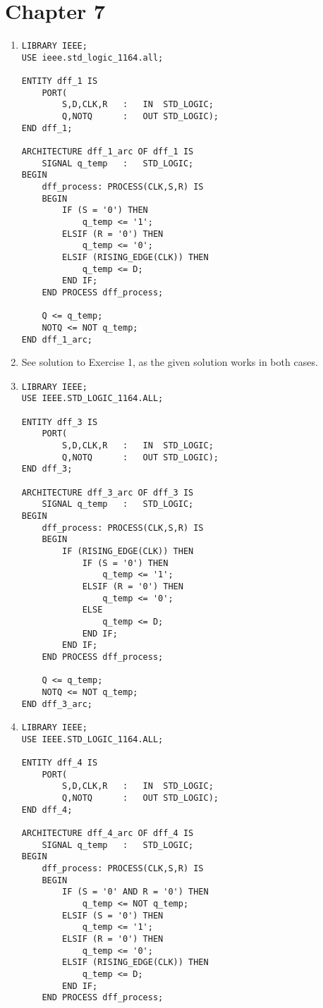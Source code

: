 \section*{Chapter 7}
\begin{enumerate}
	\item 
	\begin{lstlisting}
LIBRARY IEEE;
USE ieee.std_logic_1164.all;

ENTITY dff_1 IS
	PORT(
		S,D,CLK,R	:	IN	STD_LOGIC;
		Q,NOTQ		:	OUT	STD_LOGIC);
END dff_1;

ARCHITECTURE dff_1_arc OF dff_1 IS
	SIGNAL q_temp	:	STD_LOGIC;
BEGIN
	dff_process: PROCESS(CLK,S,R) IS
	BEGIN
		IF (S = '0') THEN
			q_temp <= '1';
		ELSIF (R = '0') THEN
			q_temp <= '0';
		ELSIF (RISING_EDGE(CLK)) THEN
			q_temp <= D;
		END IF;
	END PROCESS dff_process;
	
	Q <= q_temp;
	NOTQ <= NOT q_temp;
END dff_1_arc;
	\end{lstlisting}
	\item See solution to Exercise 1, as the given solution works in both cases.
	
	\item 
	\begin{lstlisting}
LIBRARY IEEE;
USE IEEE.STD_LOGIC_1164.ALL;

ENTITY dff_3 IS
	PORT(
		S,D,CLK,R	:	IN	STD_LOGIC;
		Q,NOTQ		:	OUT	STD_LOGIC);
END dff_3;

ARCHITECTURE dff_3_arc OF dff_3 IS
	SIGNAL q_temp	:	STD_LOGIC;
BEGIN
	dff_process: PROCESS(CLK,S,R) IS
	BEGIN
		IF (RISING_EDGE(CLK)) THEN
			IF (S = '0') THEN
				q_temp <= '1';
			ELSIF (R = '0') THEN
				q_temp <= '0';
			ELSE
				q_temp <= D;
			END IF;
		END IF;
	END PROCESS dff_process;
	
	Q <= q_temp;
	NOTQ <= NOT q_temp;
END dff_3_arc;
	\end{lstlisting}
	
	\item 
	\begin{lstlisting}
LIBRARY IEEE;
USE IEEE.STD_LOGIC_1164.ALL;

ENTITY dff_4 IS
	PORT(
		S,D,CLK,R	:	IN	STD_LOGIC;
		Q,NOTQ		:	OUT	STD_LOGIC);
END dff_4;

ARCHITECTURE dff_4_arc OF dff_4 IS
	SIGNAL q_temp	:	STD_LOGIC;
BEGIN
	dff_process: PROCESS(CLK,S,R) IS
	BEGIN
		IF (S = '0' AND R = '0') THEN
			q_temp <= NOT q_temp;
		ELSIF (S = '0') THEN
			q_temp <= '1';
		ELSIF (R = '0') THEN
			q_temp <= '0';
		ELSIF (RISING_EDGE(CLK)) THEN
			q_temp <= D;
		END IF;
	END PROCESS dff_process;
	

\end{lstlisting}
\end{enumerate}
